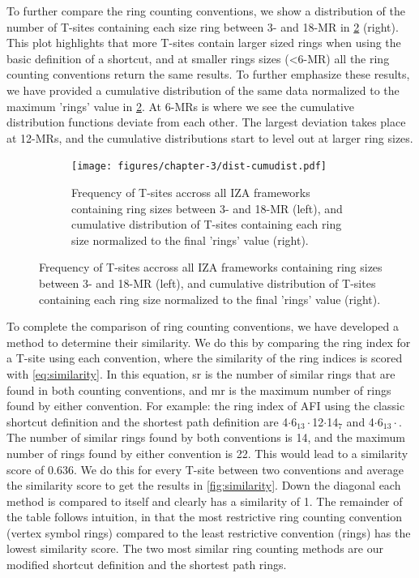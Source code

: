 \documentclass[preprint,numrefs,noinfo,sort&compress]{elsarticle}
\begin{document}
To further compare the ring counting conventions, we show a distribution of the number of T-sites containing each size ring between 3- and 18-MR in \cref{fig:tsite-frequency} (right). This plot highlights that more T-sites contain larger sized rings when using the basic definition of a shortcut, and at smaller rings sizes (\textless6-MR) all the ring counting conventions return the same results.  To further emphasize these results, we have provided a cumulative distribution of the same data normalized to the maximum 'rings' value in \cref{fig:tsite-frequency}. At 6-MRs is where we see the cumulative distribution functions deviate from each other. The largest deviation takes place at 12-MRs, and the cumulative distributions start to level out at larger ring sizes. 

\begin{figure}
\begin{figure}[H]
\centering
\texttt{[image: figures/chapter-3/dist-cumudist.pdf]}
\caption{Frequency of T-sites accross all IZA frameworks containing ring sizes between 3- and 18-MR (left), and cumulative distribution of T-sites containing each ring size normalized to the final 'rings' value (right). \label{fig:tsite-frequency}}
\end{figure}
\end{figure}

To complete the comparison of ring counting conventions, we have developed a method to determine their similarity. We do this by comparing the ring index for a T-site using each convention, where the similarity of the ring indices is scored with \cref{eq:similarity}. In this equation, sr is the number of similar rings that are found in both counting conventions, and mr is the maximum number of rings found by either convention. For example: the ring index of AFI using the classic shortcut definition and the shortest path definition are 4\(\cdot\)6\(_{\text{13}} \cdot\)12\(\cdot\)14\(_{\text{7}}\) and 4\(\cdot\)6\(_{\text{13}} \cdot\). The number of similar rings found by both conventions is 14, and the maximum number of rings found by either convention is 22. This would lead to a similarity score of 0.636. We do this for every T-site between two conventions and average the similarity score to get the results in \cref{fig:similarity}. Down the diagonal each method is compared to itself and clearly has a similarity of 1. The remainder of the table follows intuition, in that the  most restrictive ring counting convention (vertex symbol rings) compared to the least restrictive convention (rings) has the lowest similarity score. The two most similar ring counting methods are our modified shortcut definition and the shortest path rings. 
\end{document}

